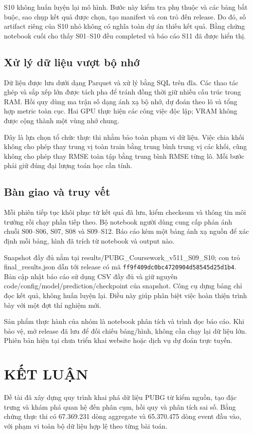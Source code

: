 \documentclass[12pt,a4paper]{article}
\begin{document}
S10 không huấn luyện lại mô hình. Bước này kiểm tra phụ thuộc và các bảng bắt buộc, sao chụp kết quả được chọn, tạo manifest và con trỏ đến release. Do đó, số artifact riêng của S10 nhỏ không có nghĩa toàn dự án thiếu kết quả. Bằng chứng notebook cuối cho thấy S01--S10 đều completed và báo cáo S11 đã được hiển thị.
\subsection{Xử lý dữ liệu vượt bộ nhớ}
Dữ liệu được lưu dưới dạng Parquet và xử lý bằng SQL trên đĩa. Các thao tác ghép và sắp xếp lớn được tách pha để tránh đồng thời giữ nhiều cấu trúc trong RAM. Hồi quy dùng ma trận số dạng ánh xạ bộ nhớ, dự đoán theo lô và tổng hợp metric toàn cục. Hai GPU thực hiện các công việc độc lập; VRAM không được cộng thành một vùng nhớ chung.

Đây là lựa chọn tổ chức thực thi nhằm bảo toàn phạm vi dữ liệu. Việc chia khối không cho phép thay trung vị toàn train bằng trung bình trung vị các khối, cũng không cho phép thay RMSE toàn tập bằng trung bình RMSE từng lô. Mỗi bước phải giữ đúng đại lượng toán học cần tính.
\subsection{Bàn giao và truy vết}
Mỗi phiên tiếp tục khôi phục từ kết quả đã lưu, kiểm checksum và thông tin môi trường rồi chạy phần tiếp theo. Bộ notebook người dùng cung cấp phản ánh chuỗi S00--S06, S07, S08 và S09--S12. Báo cáo kèm một bảng ánh xạ nguồn để xác định mỗi bảng, hình đã trích từ notebook và output nào.

Snapshot đầy đủ nằm tại results/PUBG\_Coursework\_v511\_S09\_S10; con trỏ final\_results.json dẫn tới release có mã \texttt{ff9f409dc0bc4720904d58545d25d1b4}. Bản cập nhật báo cáo sử dụng CSV đầy đủ và giữ nguyên code/config/model/prediction/checkpoint của snapshot. Công cụ dựng bảng chỉ đọc kết quả, không huấn luyện lại. Điều này giúp phân biệt việc hoàn thiện trình bày với một đợt thí nghiệm mới.

Sản phẩm thực hành của nhóm là notebook phân tích và trình đọc báo cáo. Khi bảo vệ, mở release đã lưu để đối chiếu bảng/hình, không cần chạy lại dữ liệu lớn. Phiên bản hiện tại chưa triển khai website hoặc dịch vụ dự đoán trực tuyến.
\clearpage
\section{KẾT LUẬN}
Đề tài đã xây dựng quy trình khai phá dữ liệu PUBG từ kiểm nguồn, tạo đặc trưng và khám phá quan hệ đến phân cụm, hồi quy và phân tích sai số. Bằng chứng thực thi có 67.369.231 dòng aggregate và 65.370.475 dòng event đầu vào, với phạm vi toàn bộ dữ liệu hợp lệ theo từng bài toán.
\end{document}
